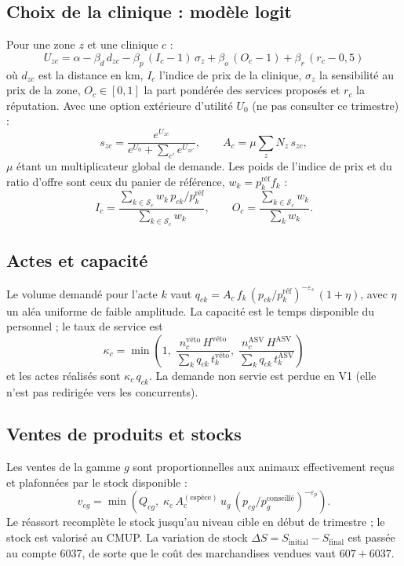 \documentclass[11pt,a4paper]{article}
\begin{document}
\subsection{Choix de la clinique : modèle logit}

Pour une zone $z$ et une clinique $c$ :
\[
  U_{zc} = \alpha - \beta_d\, d_{zc} - \beta_p\,(I_c - 1)\,\sigma_z
  + \beta_o\,(O_c - 1) + \beta_r\,(r_c - 0{,}5)
\]
où $d_{zc}$ est la distance en km, $I_c$ l'indice de prix de la clinique,
$\sigma_z$ la sensibilité au prix de la zone, $O_c \in [0,1]$ la part
pondérée des services proposés et $r_c$ la réputation. Avec une option
extérieure d'utilité $U_0$ (ne pas consulter ce trimestre) :
\[
  s_{zc} = \frac{e^{U_{zc}}}{e^{U_0} + \sum_{c'} e^{U_{zc'}}},
  \qquad
  A_c = \mu \sum_z N_z\, s_{zc},
\]
$\mu$ étant un multiplicateur global de demande. Les poids de l'indice de
prix et du ratio d'offre sont ceux du panier de référence,
$w_k = p_k^{\text{réf}} f_k$ :
\[
  I_c = \frac{\sum_{k \in \mathcal{S}_c} w_k\, p_{ck}/p_k^{\text{réf}}}{\sum_{k \in \mathcal{S}_c} w_k},
  \qquad
  O_c = \frac{\sum_{k \in \mathcal{S}_c} w_k}{\sum_k w_k}.
\]

\subsection{Actes et capacité}

Le volume demandé pour l'acte $k$ vaut
$q_{ck} = A_c\, f_k\, (p_{ck}/p_k^{\text{réf}})^{-\varepsilon_s}\,(1+\eta)$,
avec $\eta$ un aléa uniforme de faible amplitude. La capacité est le temps
disponible du personnel ; le taux de service est
\[
  \kappa_c = \min\!\left(1,\;
  \frac{n^{\text{véto}}_c\, H^{\text{véto}}}{\sum_k q_{ck}\, t^{\text{véto}}_k},\;
  \frac{n^{\text{ASV}}_c\, H^{\text{ASV}}}{\sum_k q_{ck}\, t^{\text{ASV}}_k}\right)
\]
et les actes réalisés sont $\kappa_c\, q_{ck}$. La demande non servie est
perdue en V1 (elle n'est pas redirigée vers les concurrents).

\subsection{Ventes de produits et stocks}

Les ventes de la gamme $g$ sont proportionnelles aux animaux effectivement
reçus et plafonnées par le stock disponible :
\[
  v_{cg} = \min\!\left(Q_{cg},\;
  \kappa_c\, A_c^{(\text{espèce})}\, u_g\,(p_{cg}/p_g^{\text{conseillé}})^{-\varepsilon_p}\right).
\]
Le réassort recomplète le stock jusqu'au niveau cible en début de
trimestre ; le stock est valorisé au CMUP. La variation de stock
$\Delta S = S_{\text{initial}} - S_{\text{final}}$ est passée au compte 6037,
de sorte que le coût des marchandises vendues vaut $607 + 6037$.
\end{document}
